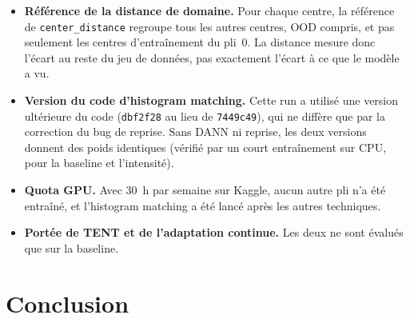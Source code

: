 \begin{itemize}
  \item \textbf{Référence de la distance de domaine.} Pour chaque centre, la référence de \nolinkurl{center_distance} regroupe tous les autres centres, OOD compris, et pas seulement les centres d'entraînement du pli~0. La distance mesure donc l'écart au reste du jeu de données, pas exactement l'écart à ce que le modèle a vu.
  \item \textbf{Version du code d'histogram matching.} Cette run a utilisé une version ultérieure du code (\texttt{dbf2f28} au lieu de \texttt{7449c49}), qui ne diffère que par la correction du bug de reprise. Sans DANN ni reprise, les deux versions donnent des poids identiques (vérifié par un court entraînement sur CPU, pour la baseline et l'intensité).
  \item \textbf{Quota GPU.} Avec 30~h par semaine sur Kaggle, aucun autre pli n'a été entraîné, et l'histogram matching a été lancé après les autres techniques.
  \item \textbf{Portée de TENT et de l'adaptation continue.} Les deux ne sont évalués que sur la baseline.
\end{itemize}

\section{Conclusion}
\label{sec:rq3-conclusion}

